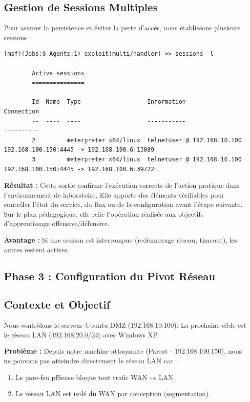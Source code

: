 \documentclass[12pt,a4paper,openany]{report}
\begin{document}
	\subsection{Gestion de Sessions Multiples}
	
	Pour assurer la persistence et éviter la perte d'accès, nous établissons plusieurs sessions :
	
	\begin{lstlisting}[caption=Sessions Multiples Actives]
		[msf](Jobs:0 Agents:1) exploit(multi/handler) >> sessions -l
		
		Active sessions
		===============
		
		Id  Name  Type                   Information                  Connection
		--  ----  ----                   -----------                  ----------
		2         meterpreter x64/linux  telnetuser @ 192.168.10.100  192.168.100.150:4445 -> 192.168.100.6:13089
		3         meterpreter x64/linux  telnetuser @ 192.168.10.100  192.168.100.150:4445 -> 192.168.100.6:39722
	\end{lstlisting}
	
	\textbf{Résultat :} Cette sortie confirme l'exécution correcte de l'action pratique dans l'environnement de laboratoire. Elle apporte des éléments vérifiables pour contrôler l'état du service, du flux ou de la configuration avant l'étape suivante. Sur le plan pédagogique, elle relie l'opération réalisée aux objectifs d'apprentissage offensive/défensive.
	
	
	\textbf{Avantage :} Si une session est interrompue (redémarrage réseau, timeout), les autres restent actives.
	
	\subsection{Phase 3 : Configuration du Pivot Réseau}
	
	\subsection{Contexte et Objectif}
	
	Nous contrôlons le serveur Ubuntu DMZ (192.168.10.100). La prochaine cible est le réseau LAN (192.168.20.0/24) avec Windows XP.
	
	\textbf{Problème :} Depuis notre machine attaquante (Parrot - 192.168.100.150), nous ne pouvons pas atteindre directement le réseau LAN car :
	\begin{enumerate}
		\item Le pare-feu pfSense bloque tout trafic WAN → LAN.
		\item Le réseau LAN est isolé du WAN par conception (segmentation).
	\end{enumerate}
	
\end{document}
